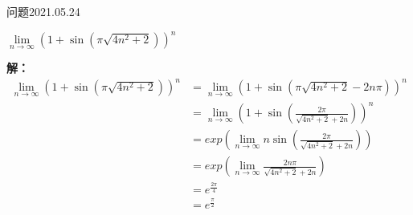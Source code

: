 \begin{mybox}{问题2021.05.24}
	
	\qquad $\lim \limits_{n\to\infty} (1+\sin(\pi\sqrt{4n^2+2}))^{n}$
\end{mybox}
\noindent
\textbf{解：}
\begin{align*}
	\lim \limits_{n\to\infty} (1+\sin(\pi\sqrt{4n^2+2}))^{n}&=\lim \limits_{n\to\infty} (1+\sin(\pi\sqrt{4n^2+2}-2n\pi))^{n}\\
	&=\lim \limits_{n\to\infty} (1+\sin(\frac{2\pi}{\sqrt{4n^2+2}+2n}))^{n}\\
	&=exp(\lim\limits_{n\to\infty} n\sin(\frac{2\pi}{\sqrt{4n^2+2}+2n}))\\
	&=exp(\lim\limits_{n\to\infty} \frac{2n\pi}{\sqrt{4n^2+2}+2n})\\
	&=e^{\frac{2\pi}{4}}\\
	&=e^{\frac{\pi}{2}}
\end{align*}